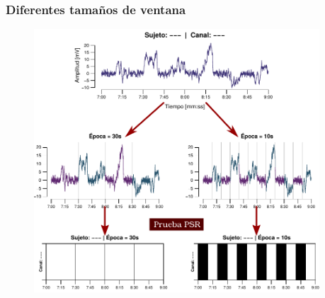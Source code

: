 \documentclass[serif,mathserif,professionalfont]{beamer}
\begin{document}
\begin{frame}\frametitle{Diferentes tamaños de ventana}
\begin{figure}
\includegraphics[width=0.95\textwidth]
{./img_diagramas/epocas_diferentes_v2.pdf}
\end{figure}
\end{frame}




\end{document}
